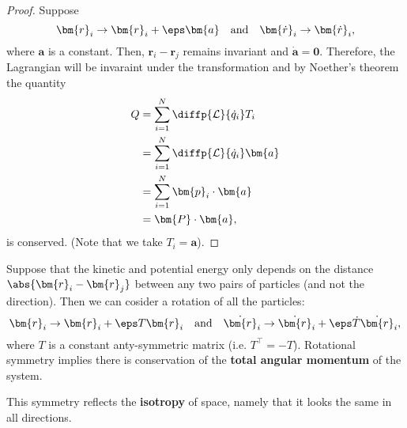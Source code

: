\documentclass[12pt, a4paper]{article}
\begin{document}
\begin{proof}
    Suppose
    \[\bm{r}_i \to \bm{r}_i +\eps \bm{a} \quad \text{and} \quad \bm{\dot{r}}_i \to \bm{\dot{r}}_i,\]
    where \(\bm{a}\) is a constant. Then, \(\bm{r}_i-\bm{r}_j\) remains invariant and \(\bm{\dot{a}}=\bm{0}\). Therefore, the Lagrangian will be invaraint under the transformation and by Noether's theorem the quantity 
    \[\begin{aligned}
        Q &= \sum_{i=1}^{N} \diffp{\mathcal{L}}{{\dot{q}_i}} T_i \\
        &= \sum_{i=1}^{N} \diffp{\mathcal{L}}{{\dot{q}_i}} \bm{a} \\
        &= \sum_{i=1}^{N} \bm{p}_i \cdot \bm{a} \\
        &= \bm{P} \cdot \bm{a},
    \end{aligned}\]
    is conserved. (Note that we take \(T_i = \bm{a}\)).
\end{proof}

\begin{mdthm}
    Suppose that the kinetic and potential energy only depends on the distance \(\abs{\bm{r}_i - \bm{r}_j}\) between any two pairs of particles (and not the direction). Then we can cosider a rotation of all the particles:
    \[\bm{r}_i \to \bm{r}_i + \eps T \bm{r}_i \quad \text{and} \quad \dot{\bm{r}}_i \to \dot{\bm{r}}_i +\eps \dot{T} \dot{\bm{r}}_i,\]
    where \(T\) is a constant anty-symmetric matrix (i.e. \(T^{\top}=-T\)). Rotational symmetry implies there is conservation of the \textbf{total angular momentum} of the system.
\end{mdthm}

\begin{mdremark}
    This symmetry reflects the \textbf{isotropy} of space, namely that it looks the same in all directions.
\end{mdremark}
\end{document}
